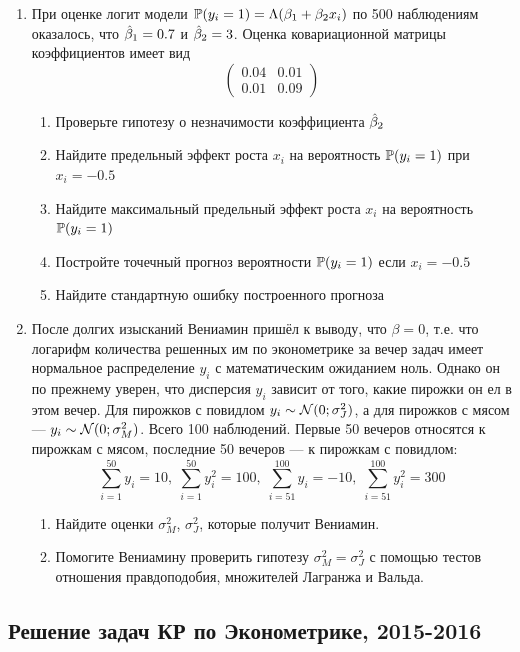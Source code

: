 \documentclass[12pt, a4paper]{article}
\begin{document}
\begin{enumerate}
\item При оценке логит модели
\(
\P(y_i=1)=\Lambda(\b_1+\b_2 x_i)
\)
по 500 наблюдениям оказалось, что $\hb_1=0.7$ и $\hb_2=3$. Оценка ковариационной матрицы коэффициентов имеет вид
\[
\begin{pmatrix}
  0.04 & 0.01 \\
  0.01 & 0.09
\end{pmatrix}
\]

\begin{enumerate}
\item Проверьте гипотезу о незначимости коэффициента $\hb_2$
\item Найдите предельный эффект роста $x_i$ на вероятность $\P(y_i=1)$ при $x_i=-0.5$
\item Найдите максимальный предельный эффект роста $x_i$ на вероятность $\P(y_i=1)$
\item Постройте точечный прогноз вероятности $\P(y_i=1)$ если $x_i = -0.5$
\item Найдите стандартную ошибку построенного прогноза
\end{enumerate}

\item После долгих изысканий Вениамин пришёл к выводу, что $\beta=0$, т.е. что логарифм количества решенных им по эконометрике за вечер задач имеет нормальное распределение $y_i$ с математическим ожиданием ноль. Однако он по прежнему уверен, что дисперсия $y_i$ зависит от того, какие пирожки он ел в этом вечер. Для пирожков с повидлом $y_i \sim \cN(0;\sigma^2_J)$, а для пирожков с мясом — $y_i\sim \cN(0;\sigma^2_M)$. Всего 100 наблюдений. Первые 50 вечеров относятся к пирожкам с мясом, последние 50 вечеров — к пирожкам с повидлом:
\[
\sum_{i=1}^{50} y_i = 10, \; \sum_{i=1}^{50} y_i^2 = 100, \;
\sum_{i=51}^{100} y_i = -10, \; \sum_{i=51}^{100} y_i^2 = 300
\]
\begin{enumerate}
\item Найдите оценки $\sigma^2_M$, $\sigma^2_J$, которые получит Вениамин.
\item Помогите Вениамину проверить гипотезу $\sigma^2_M = \sigma^2_J$ с помощью тестов отношения правдоподобия, множителей Лагранжа и Вальда.
\end{enumerate}

\end{enumerate}


\subsection{Решение задач КР по Эконометрике, 2015-2016}
\end{document}
